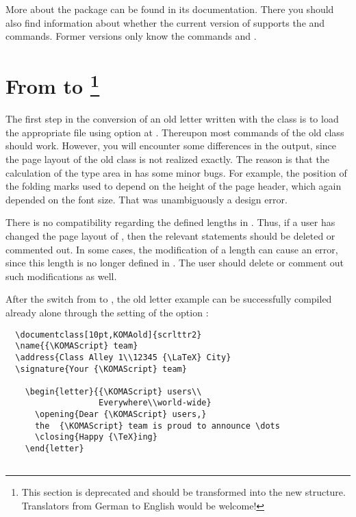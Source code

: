 More about the  package can be found in its
documentation. There you should also find information about whether
the current version of  supports the
 and  commands.  Former versions only
know the commands  and .
%
%
%
%

\section{From  to \protect\footnote{This section is
  deprecated and should be transformed into the new structure. Translators
  from German to English would be welcome!}}
\label{sec:scrlttr2.fromscrlettr}

The first step in the conversion of an old letter written with the
 class is to load the appropriate  file
using option  at .  Thereupon
most commands of the old class should work.  However, you will
encounter some differences in the output, since the page layout of the
old class is not realized exactly. The reason is that the calculation
of the type area in  has some minor bugs. For example,
the position of the folding marks used to depend on the height of the
page header, which again depended on the font size. That was
unambiguously a design error.

There is no compatibility regarding the defined lengths in
. Thus, if a user has changed the page layout of
, then the relevant statements should be deleted or
commented out. In some cases, the modification of a length can cause
an error, since this length is no longer defined in .
The user should delete or comment out such modifications as well.

After the switch from  to , the old
letter example can be successfully compiled already alone through the
setting of the option :
\begin{lstlisting}
  \documentclass[10pt,KOMAold]{scrlttr2}
  \name{{\KOMAScript} team}
  \address{Class Alley 1\\12345 {\LaTeX} City}
  \signature{Your {\KOMAScript} team}
  
    \begin{letter}{{\KOMAScript} users\\
                   Everywhere\\world-wide}
      \opening{Dear {\KOMAScript} users,}
      the  {\KOMAScript} team is proud to announce \dots
      \closing{Happy {\TeX}ing}
    \end{letter}
  
\end{lstlisting}


